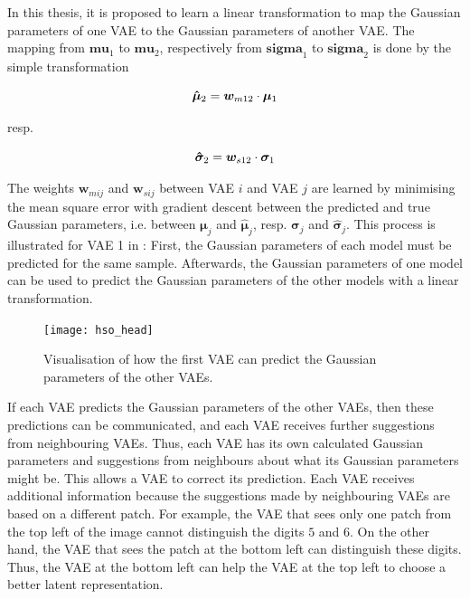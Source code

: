 In this thesis, it is proposed to learn a linear transformation to map the Gaussian parameters of one VAE to the Gaussian parameters of another VAE. The mapping from $\boldsymbol{mu}_1$ to $\boldsymbol{mu}_2$, respectively from $\boldsymbol{sigma}_1$ to $\boldsymbol{sigma}_2$ is done by the simple transformation

\begin{equation}\eqlbl{hso_7}
	\boldsymbol{\hat{\mu}}_2 = \boldsymbol{w}_{m12} \cdot \boldsymbol{\mu}_1
\end{equation}

resp.

\begin{equation}\eqlbl{hso_8}
	\boldsymbol{\hat{\sigma}}_2 = \boldsymbol{w}_{s12} \cdot \boldsymbol{\sigma}_1
\end{equation}

The weights $\boldsymbol{w}_{mij}$ and $\boldsymbol{w}_{sij}$ between VAE $i$ and VAE $j$ are learned by minimising the mean square error with gradient descent between the predicted and true Gaussian parameters, i.e. between $\boldsymbol{\mu}_j$ and $\boldsymbol{\hat{\mu}}_j$, resp. $\boldsymbol{\sigma}_j$ and $\boldsymbol{\hat{\sigma}}_j$. This process is illustrated for VAE 1 in : First, the Gaussian parameters of each model must be predicted for the same sample. Afterwards, the Gaussian parameters of one model can be used to predict the Gaussian parameters of the other models with a linear transformation.

\begin{figure}[h]
    \centering
    \texttt{[image: hso\_head]}
    \caption[Prediction of Gaussian parameters of other VAEs]{Visualisation of how the first VAE can predict the Gaussian parameters of the other VAEs.}
\end{figure}

If each VAE predicts the Gaussian parameters of the other VAEs, then these predictions can be communicated, and each VAE receives further suggestions from neighbouring VAEs. Thus, each VAE has its own calculated Gaussian parameters and suggestions from neighbours about what its Gaussian parameters might be. This allows a VAE to correct its prediction. Each VAE receives additional information because the suggestions made by neighbouring VAEs are based on a different patch. For example, the VAE that sees only one patch from the top left of the image cannot distinguish the digits $5$ and $6$. On the other hand, the VAE that sees the patch at the bottom left can distinguish these digits. Thus, the VAE at the bottom left can help the VAE at the top left to choose a better latent representation.

